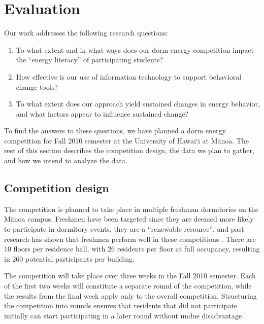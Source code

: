 
\section{Evaluation}
\label{sec:evaluation}

Our work addresses the following research questions:

\begin{enumerate}
	\item To what extent and in what ways does our dorm energy competition impact the ``energy literacy'' of participating students?
	\item How effective is our use of information technology to support behavioral change tools?
	\item To what extent does our approach yield sustained changes in energy behavior, and what factors appear to influence sustained change?
\end{enumerate}

To find the answers to these questions, we have planned a dorm energy competition for Fall 2010 semester at the University of Hawai`i at M\=anoa. The rest of this section describes the competition design, the data we plan to gather, and how we intend to analyze the data.

\subsection{Competition design}

The competition is planned to take place in multiple freshman dormitories on the M\=anoa campus. Freshmen have been targeted since they are deemed more likely to participate in dormitory events, they are a ``renewable resource'', and past research has shown that freshmen perform well in these competitions \cite{petersen-dorm-energy-reduction}. There are 10 floors per residence hall, with 26 residents per floor at full occupancy, resulting in 260 potential participants per building.

The competition will take place over three weeks in the Fall 2010 semester. Each of the first two weeks will constitute a separate round of the competition, while the results from the final week apply only to the overall competition. Structuring the competition into rounds ensures that residents that did not participate initially can start participating in a later round without undue disadvantage.

